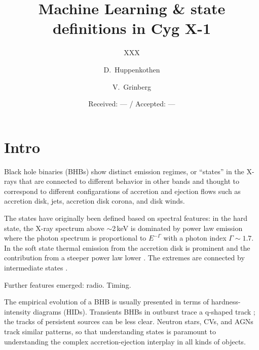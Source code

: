 \documentclass{aa}
\begin{document}
\title{Machine Learning \& state definitions in Cyg X-1} 
\subtitle{XXX}


\author{\mbox{D.~Huppenkothen\inst{\ref{affil:nyu}}} \and
\mbox{V.~Grinberg\inst{\ref{affil:mit}}}
} 
\date {Received: --- / Accepted: ---}



\maketitle

\section{Intro}

Black hole binaries (BHBs) show distinct emission regimes, or
``states'' in the X-rays that are connected to different behavior in
other bands and thought to correspond to different configarations of
accretion and ejection flows such as accretion disk, jets, accretion
disk corona, and disk winds. 


The states have originally been defined based on spectral features:
in the hard state, the X-ray spectrum above $\sim$2\,keV is dominated
by power law emission where the photon spectrum is proportional to
$E^{-\Gamma}$ with a photon index $\Gamma \sim 1.7$. In the
soft state thermal emission from the accretion disk is prominent and
the contribution from a steeper power law lower
\citep[e.g.,][]{McClintock_Remillard_2006a_book}.  The extremes are
connected by intermediate states \citep{Fender_2009a,Belloni_2010a}.

Further features emerged: radio. Timing.

The empirical evolution of a BHB is usually presented in terms of
hardness-intensity diagrams (HIDs). Transients BHBs in outburst trace
a \textsf{q}-shaped track \citep{Homan_2005a,Fender_2004a}; the tracks of persistent sources can be less
clear. Neutron stars, CVs, and AGNs track similar patterns, so that
understanding states is paramount to understanding the complex
accretion-ejection interplay in all kinds of objects.
\end{document}
